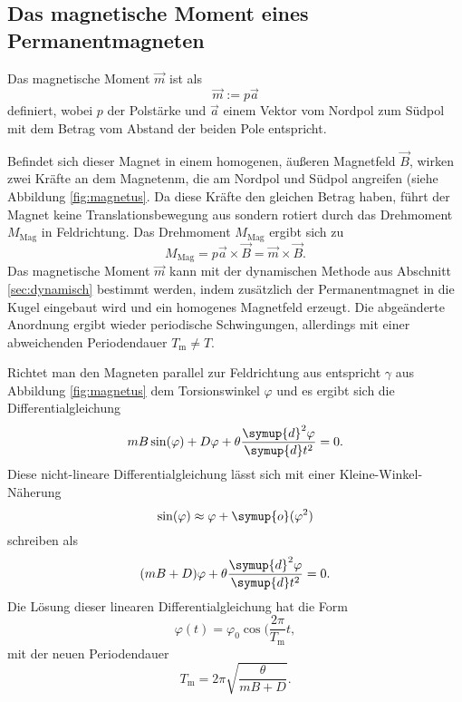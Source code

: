 \FloatBarrier
\subsection{Das magnetische Moment eines Permanentmagneten}

Das magnetische Moment $\vec{m}$ ist als 
\begin{equation}
	\vec{m} := p \vec{a}
\end{equation}
definiert, wobei $p$ der Polstärke und $\vec{a}$ einem Vektor vom Nordpol zum Südpol mit dem 
Betrag vom Abstand der beiden Pole entspricht.

Befindet sich dieser Magnet in einem homogenen, äußeren Magnetfeld $\vec{B}$, wirken zwei 
Kräfte an dem Magnetenm, die am Nordpol und Südpol angreifen (siehe Abbildung \ref{fig:magnetus}.
Da diese Kräfte den gleichen Betrag haben, führt der Magnet keine Translationsbewegung aus 
sondern rotiert durch das Drehmoment $M_{\mathrm{Mag}}$ in Feldrichtung.
Das Drehmoment $M_{\mathrm{Mag}}$ ergibt sich zu
\begin{equation}
	M_{\mathrm{Mag}} = p \vec{a} \times \vec{B} = \vec{m} \times \vec{B} \mathrm{.} 
\end{equation}
Das magnetische Moment $\vec{m}$ kann mit der dynamischen Methode aus Abschnitt
\ref{sec:dynamisch} bestimmt werden, indem zusätzlich der Permanentmagnet in die Kugel eingebaut
wird und ein homogenes Magnetfeld erzeugt.
Die abgeänderte Anordnung ergibt wieder periodische Schwingungen, allerdings mit einer 
abweichenden Periodendauer $T_{\mathrm{m}} \neq T$.

Richtet man den Magneten parallel zur Feldrichtung aus entspricht $\gamma$ aus Abbildung 
\ref{fig:magnetus} dem Torsionswinkel $\varphi$ und es ergibt sich die Differentialgleichung
\begin{equation}
	m B \sin(\varphi)  + D \varphi + \theta \frac{\symup{d}^2 \varphi}{\symup{d} t^2} = 0
	\mathrm{.}
\end{equation}
Diese nicht-lineare Differentialgleichung lässt sich mit einer Kleine-Winkel-Näherung 
\begin{equation*}
	\sin(\varphi) \approx \varphi + \symup{o}(\varphi^2)
\end{equation*}
schreiben als
\begin{equation}
	(mB + D) \varphi + \theta \frac{\symup{d}^2 \varphi}{\symup{d} t^2} = 0 \mathrm{.} 
\end{equation}
Die Lösung dieser linearen Differentialgleichung hat die Form 
\begin{equation}
	\varphi(t) = \varphi_0 \cos(\frac{2\pi}{T_{\mathrm{m}}} t \mathrm{,}
\end{equation}
mit der neuen Periodendauer
\begin{equation}
	T_{\mathrm{m}} = 2\pi \sqrt{\frac{\theta}{mB + D}} \mathrm{.}
\end{equation}











